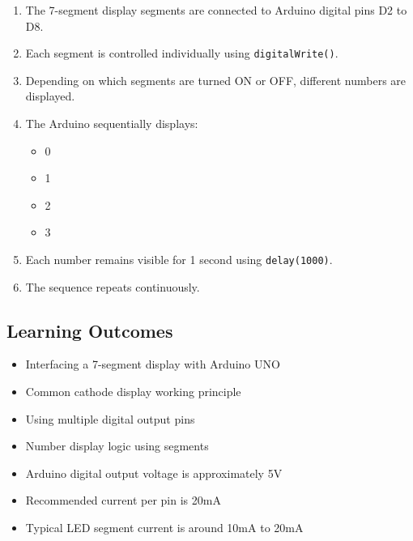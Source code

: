 \begin{enumerate}

\item The 7-segment display segments are connected to Arduino digital pins D2 to D8.

\item Each segment is controlled individually using \texttt{digitalWrite()}.

\item Depending on which segments are turned ON or OFF, different numbers are displayed.

\item The Arduino sequentially displays:

\begin{itemize}
\item 0 \item 1 \item 2 \item 3
\end{itemize}

\item Each number remains visible for 1 second using \texttt{delay(1000)}.

\item The sequence repeats continuously.

\end{enumerate}


\subsection{Learning Outcomes}

\begin{itemize}

\item Interfacing a 7-segment display with Arduino UNO

\item Common cathode display working principle

\item Using multiple digital output pins

\item Number display logic using segments

\item Arduino digital output voltage is approximately 5V

\item Recommended current per pin is 20mA

\item Typical LED segment current is around 10mA to 20mA

\end{itemize}

